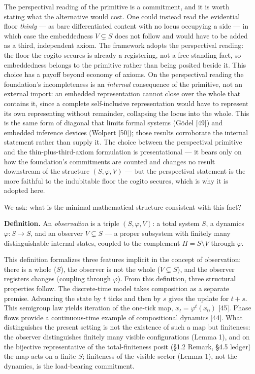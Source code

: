 \documentclass[
]{article}
\begin{document}
The perspectival reading of the primitive is a commitment, and it is
worth stating what the alternative would cost. One could instead read
the evidential floor \emph{thinly} --- as bare differentiated content
with no locus occupying a side --- in which case the embeddedness
\(V \subsetneq S\) does not follow and would have to be added as a
third, independent axiom. The framework adopts the perspectival reading:
the floor the cogito secures is already a registering, not a
free-standing fact, so embeddedness belongs to the primitive rather than
being posited beside it. This choice has a payoff beyond economy of
axioms. On the perspectival reading the foundation's incompleteness is
an \emph{internal} consequence of the primitive, not an external import:
an embedded representation cannot close over the whole that contains it,
since a complete self-inclusive representation would have to represent
its own representing without remainder, collapsing the locus into the
whole. This is the same form of diagonal that limits formal systems
(Gödel {[}49{]}) and embedded inference devices (Wolpert {[}50{]});
those results corroborate the internal statement rather than supply it.
The choice between the perspectival primitive and the
thin-plus-third-axiom formulation is presentational --- it bears only on
how the foundation's commitments are counted and changes no result
downstream of the structure \((S, \varphi, V)\) --- but the perspectival
statement is the more faithful to the indubitable floor the cogito
secures, which is why it is adopted here.

We ask: what is the minimal mathematical structure consistent with this
fact?

\textbf{Definition.} An \emph{observation} is a triple
\((S, \varphi, V)\): a total system \(S\), a dynamics
\(\varphi: S \to S\), and an observer \(V \subsetneq S\) --- a proper
subsystem with finitely many distinguishable internal states, coupled to
the complement \(H = S \setminus V\) through \(\varphi\).

This definition formalizes three features implicit in the concept of
observation: there is a whole (\(S\)), the observer is not the whole
(\(V \subsetneq S\)), and the observer registers changes (coupling
through \(\varphi\)). From this definition, three structural properties
follow. The discrete-time model takes composition as a separate premise.
Advancing the state by \(t\) ticks and then by \(s\) gives the update
for \(t+s\). This semigroup law yields iteration of the one-tick map,
\(x_t = \varphi^t(x_0)\) {[}45{]}. Phase flows provide a continuous-time
example of compositional dynamics {[}44{]}. What distinguishes the
present setting is not the existence of such a map but finiteness: the
observer distinguishes finitely many visible configurations (Lemma 1),
and on the bijective representative of the total-finiteness posit (§1.2
Remark, §4.5 ledger) the map acts on a finite \(S\); finiteness of the
visible sector (Lemma 1), not the dynamics, is the load-bearing
commitment.
\end{document}
